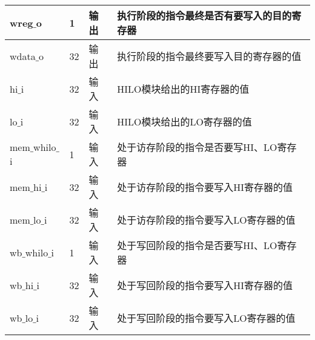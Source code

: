 \begin{table}[H]
\begin{tabular}{|l|l|l|l|}
		\hline
		wreg$\_$o & 1 & 输出 & 执行阶段的指令最终是否有要写入的目的寄存器 \\
		\hline
		wdata$\_$o & 32 & 输出 & 执行阶段的指令最终要写入目的寄存器的值 \\
		\hline
		hi$\_$i & 32 & 输入 & HILO模块给出的HI寄存器的值 \\
		\hline
		lo$\_$i & 32 & 输入 & HILO模块给出的LO寄存器的值 \\
		\hline
		mem$\_$whilo$\_$i & 1 & 输入 & 处于访存阶段的指令是否要写HI、LO寄存器 \\
		\hline
		mem$\_$hi$\_$i & 32 & 输入 & 处于访存阶段的指令要写入HI寄存器的值 \\
		\hline
		mem$\_$lo$\_$i & 32 & 输入 & 处于访存阶段的指令要写入LO寄存器的值 \\
		\hline
		wb$\_$whilo$\_$i & 1 & 输入 & 处于写回阶段的指令是否要写HI、LO寄存器 \\
		\hline
		wb$\_$hi$\_$i & 32 & 输入 & 处于写回阶段的指令要写入HI寄存器的值 \\
		\hline
		wb$\_$lo$\_$i & 32 & 输入 & 处于写回阶段的指令要写入LO寄存器的值 \\
		\hline
	\end{tabular}
\end{table}
